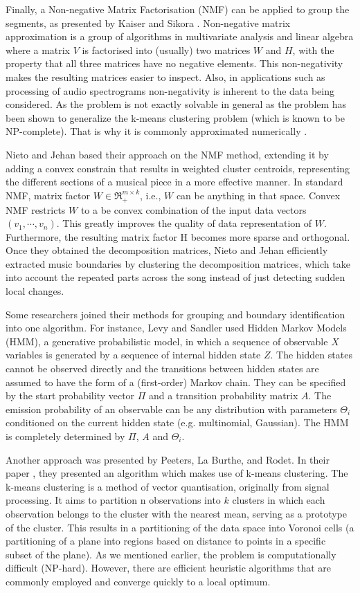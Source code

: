 Finally, a Non-negative Matrix Factorisation (NMF) can be applied to group the segments, as presented by Kaiser and Sikora \cite{Sikora}. Non-negative matrix approximation is a group of algorithms in multivariate analysis and linear algebra where a matrix $V$ is factorised into (usually) two matrices $W$ and $H$, with the property that all three matrices have no negative elements. This non-negativity makes the resulting matrices easier to inspect. Also, in applications such as processing of audio spectrograms non-negativity is inherent to the data being considered. As the problem is not exactly solvable in general as the problem has been shown to generalize the k-means clustering problem (which is known to be NP-complete). That is why it is commonly approximated numerically \cite{NMFNP}.

Nieto and Jehan \cite{Nieto} based their approach on the NMF method, extending it by adding a convex constrain that results in weighted cluster centroids, representing the different sections of a musical piece in a more effective manner. 
In standard NMF, matrix factor $W \in \Re^{m \times k}_{+}$, i.e., $W$ can be anything in that space. Convex NMF restricts $W$ to a be convex combination of the input data vectors  $(v_1, \cdots, v_n)$. This greatly improves the quality of data representation of $W$. Furthermore, the resulting matrix factor H becomes more sparse and orthogonal. Once they obtained the decomposition matrices, Nieto and Jehan efficiently extracted music boundaries by clustering the decomposition matrices, which take into account the repeated parts across the song instead of just detecting sudden local changes.

Some researchers joined their methods for grouping and boundary identification into one algorithm. For instance, Levy and Sandler used Hidden Markov Models (HMM), a generative probabilistic model, in which a sequence of observable $X$ variables is generated by a sequence of internal hidden state $Z$. The hidden states cannot be observed directly and the transitions between hidden states are assumed to have the form of a (first-order) Markov chain. They can be specified by the start probability vector $\Pi$ and a transition probability matrix $A$. The emission probability of an observable can be any distribution with parameters $\Theta_{i}$ conditioned on the current hidden state (e.g. multinomial, Gaussian). The HMM is completely determined by $\Pi$, $A$ and $\Theta_{i}$.

Another approach was presented by Peeters, La Burthe, and Rodet. In their paper \cite{Peeters}, they presented an algorithm which makes use of k-means clustering. The k-means clustering is a method of vector quantisation, originally from signal processing. It aims to partition n observations into $k$ clusters in which each observation belongs to the cluster with the nearest mean, serving as a prototype of the cluster. This results in a partitioning of the data space into Voronoi cells (a partitioning of a plane into regions based on distance to points in a specific subset of the plane).
As we mentioned earlier, the problem is computationally difficult (NP-hard). However, there are efficient heuristic algorithms that are commonly employed and converge quickly to a local optimum.

